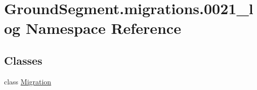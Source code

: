\hypertarget{namespace_ground_segment_1_1migrations_1_10021__log}{}\section{Ground\+Segment.\+migrations.0021\+\_\+log Namespace Reference}
\label{namespace_ground_segment_1_1migrations_1_10021__log}
\subsection*{Classes}
\begin{DoxyCompactItemize}
\item 
class \hyperlink{class_ground_segment_1_1migrations_1_10021__log_1_1_migration}{Migration}
\end{DoxyCompactItemize}
